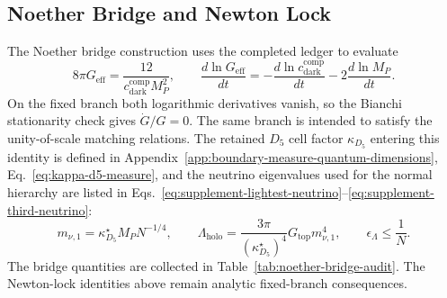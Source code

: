 \documentclass[11pt,letterpaper]{article}
\theoremstyle{plain}
\newcommand{\cdarkcomp}{c_{\text{dark}}^{\text{comp}}}
\newcommand{\Lholo}{\Lambda_{\text{holo}}}
\newcommand{\kappad}{\kappa_{D_5}}
\begin{document}
\subsection{Noether Bridge and Newton Lock}

The Noether bridge construction uses the completed ledger to evaluate
\begin{equation}
\label{eq:completion-newton-lock}
 8\pi G_{\text{eff}}
 =
 \frac{12}{\cdarkcomp M_P^2},
 \qquad
 \frac{d\ln G_{\text{eff}}}{dt}
 =
 -\frac{d\ln\cdarkcomp}{dt}-2\frac{d\ln M_P}{dt}.
\end{equation}
On the fixed branch both logarithmic derivatives vanish, so the Bianchi
stationarity check gives \(\dot G/G=0\).  The same branch is intended to
satisfy the unity-of-scale matching relations.  The retained \(D_5\) cell factor \(\kappad\) entering
this identity is defined in Appendix~\ref{app:boundary-measure-quantum-dimensions},
Eq.~\eqref{eq:kappa-d5-measure}, and the neutrino eigenvalues used for the
normal hierarchy are listed in
Eqs.~\eqref{eq:supplement-lightest-neutrino}--\eqref{eq:supplement-third-neutrino}:
\begin{equation}
\label{eq:cosmology-unity-scale}
 m_{\nu,1}=\kappad^\star M_P N^{-1/4},
 \qquad
 \Lholo=\frac{3\pi}{(\kappad^\star)^4}G_{\text{top}}m_{\nu,1}^4,
 \qquad
 \epsilon_{\Lambda}\le\frac{1}{N}.
\end{equation}
The bridge quantities are collected in Table~\ref{tab:noether-bridge-audit}.
The Newton-lock identities above remain analytic fixed-branch consequences.
\end{document}
